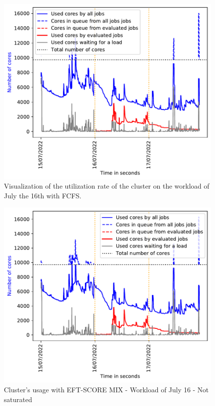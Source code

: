 \documentclass[conference,10pt]{IEEEtran}
\begin{document}
\begin{figure}[H]\centering\includegraphics[width=1\linewidth]{../MBSS/plot/Cluster_usage/2022-07-16->2022-07-16_V10000_Fcfs_Used_nodes_Reduced_450_128_32_256_4_1024_core_by_core.pdf}\caption{Visualization of the utilization rate of the cluster on the workload of July the 16th with FCFS.}\end{figure}
\begin{figure}[H]\centering\includegraphics[width=1\linewidth]{../MBSS/plot/Cluster_usage/2022-07-16->2022-07-16_V10000_Fcfs_with_a_score_mixed_strategy_x500_x1_x0_x0_Used_nodes_Reduced_450_128_32_256_4_1024_core_by_core.pdf}\caption{Cluster's usage with EFT-SCORE MIX - Workload of July 16 - Not saturated}\end{figure}
\end{document}
